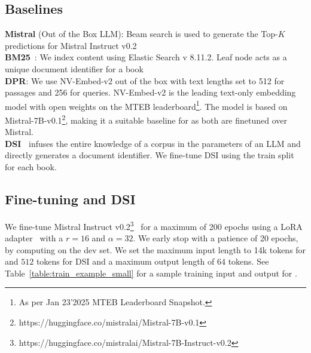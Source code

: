 \subsection{Baselines}
\label{sec:baselines}
\textbf{Mistral} (Out of the Box LLM): Beam search is used to generate the Top-$K$ predictions for Mistral Instruct v0.2\\
\textbf{BM25}~\cite{robertson2009probabilistic}: We index content using Elastic Search v 8.11.2. Leaf node acts as a unique document identifier for a book\\
\textbf{DPR}: We use NV-Embed-v2\cite{lee2024nv} out of the box with text lengths set to 512 for passages and 256 for queries. NV-Embed-v2 is the leading text-only embedding model with open weights on the MTEB leaderboard\footnote{As per Jan 23'2025 MTEB Leaderboard Snapshot.}. The model is based on Mistral-7B-v0.1\footnote{https://huggingface.co/mistralai/Mistral-7B-v0.1}, making it a suitable baseline for {\sys} as both are finetuned over Mistral.\\
\textbf{DSI~\citep{Tay2022TransformerMA}} infuses the entire knowledge of a corpus in the parameters of an LLM and directly generates a document identifier. We fine-tune DSI using the train split for each book.

\subsection{Fine-tuning {\sys} and DSI}
\label{sec:finetune}
We fine-tune Mistral Instruct v0.2\footnote{https://huggingface.co/mistralai/Mistral-7B-Instruct-v0.2}~\cite{Jiang2023Mistral7} for a maximum of 200 epochs using a LoRA adapter~\cite{Hu2021LoRALA} with a $r=16$ and $\alpha=32$. We early stop with a patience of 20 epochs, by computing {\devmetric} on the dev set. We set the maximum input length to 14k tokens for {\sys} and $512$ tokens for DSI and a maximum output length of 64 tokens. See Table~\ref{table:train_example_small} for a sample training input and output for {\sys}.

